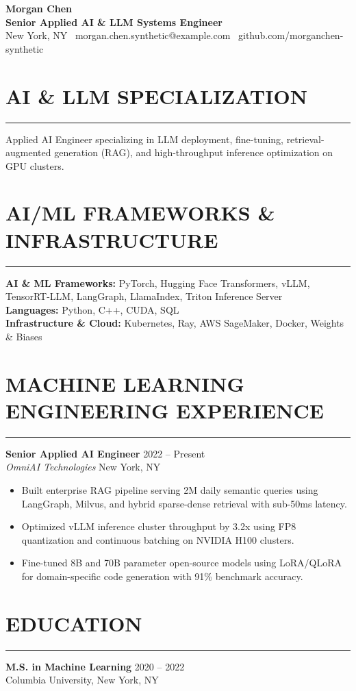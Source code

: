 \documentclass[10pt,letterpaper]{article}
\begin{document}
\begin{center}
    {\LARGE \textbf{Morgan Chen}} \\
    \vspace{2pt}
    \textbf{Senior Applied AI \& LLM Systems Engineer} \\
    New York, NY \textbar\ morgan.chen.synthetic@example.com \textbar\ github.com/morganchen-synthetic
\end{center}

\vspace{-6pt}
\section*{AI \& LLM SPECIALIZATION}
\vspace{-4pt}
\hrule
\vspace{4pt}
Applied AI Engineer specializing in LLM deployment, fine-tuning, retrieval-augmented generation (RAG), and high-throughput inference optimization on GPU clusters.

\section*{AI/ML FRAMEWORKS \& INFRASTRUCTURE}
\vspace{-4pt}
\hrule
\vspace{4pt}
\textbf{AI \& ML Frameworks:} PyTorch, Hugging Face Transformers, vLLM, TensorRT-LLM, LangGraph, LlamaIndex, Triton Inference Server \\
\textbf{Languages:} Python, C++, CUDA, SQL \\
\textbf{Infrastructure \& Cloud:} Kubernetes, Ray, AWS SageMaker, Docker, Weights \& Biases

\section*{MACHINE LEARNING ENGINEERING EXPERIENCE}
\vspace{-4pt}
\hrule
\vspace{4pt}
\textbf{Senior Applied AI Engineer} \hfill 2022 -- Present \\
\textit{OmniAI Technologies} \hfill New York, NY
\begin{itemize}
    \item Built enterprise RAG pipeline serving 2M daily semantic queries using LangGraph, Milvus, and hybrid sparse-dense retrieval with sub-50ms latency.
    \item Optimized vLLM inference cluster throughput by 3.2x using FP8 quantization and continuous batching on NVIDIA H100 clusters.
    \item Fine-tuned 8B and 70B parameter open-source models using LoRA/QLoRA for domain-specific code generation with 91\% benchmark accuracy.
\end{itemize}

\section*{EDUCATION}
\vspace{-4pt}
\hrule
\vspace{4pt}
\textbf{M.S. in Machine Learning} \hfill 2020 – 2022 \\ Columbia University, New York, NY
\end{document}
